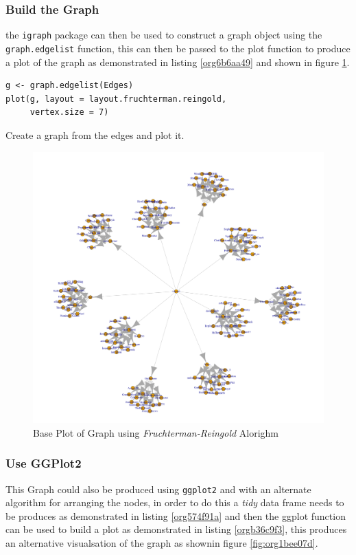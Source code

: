 \documentclass[11pt]{article}
\begin{document}
\subsubsection{Build the Graph}
\label{sec:org69c5c1f}
the \texttt{igraph} package can then be used to construct a graph object using the \texttt{graph.edgelist} function, this can then be passed to the plot function to produce a plot of the graph as demonstrated in listing \ref{org6b6aa49} and shown in figure \ref{fig:orgc5b22b2}.

\begin{listing}[htbp]
\begin{verbatim}
g <- graph.edgelist(Edges)
plot(g, layout = layout.fruchterman.reingold,
     vertex.size = 7)
\end{verbatim}
\caption{\label{org6b6aa49}Create a graph from the edges and plot it.}
\end{listing}


\begin{figure}[htbp]
\centering
\includegraphics[width=12cm]{./Figures/Graph_Base_1.png}
\caption{\label{fig:orgc5b22b2}Base Plot of Graph using \emph{Fruchterman-Reingold} Alorighm}
\end{figure}

\subsubsection{Use GGPlot2}
\label{sec:org1b0c2c8}
This Graph could also be produced using \texttt{ggplot2} and with an alternate algorithm for arranging the nodes, in order to do this a \emph{tidy} data frame needs to be produces as demonstrated in listing \ref{org574f91a} and then the ggplot function can be used to build a plot as demonstrated in listing \ref{orgb36c9f3}, this produces an alternative visualsation of the graph as shownin figure \ref{fig:org1bee07d}.
\end{document}
